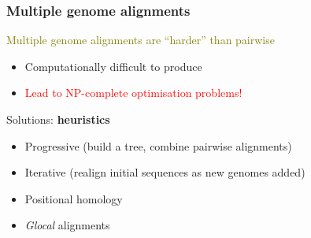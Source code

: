 %
\begin{frame}
  \frametitle{Multiple genome alignments}
  \textcolor{olive}{Multiple genome alignments are ``harder'' than pairwise} \\
  \begin{itemize}
    \item Computationally difficult to produce
    \item \textcolor{red}{Lead to NP-complete optimisation problems!}
  \end{itemize}  
  \textcolor{hutton_green}{Solutions:} \textbf{heuristics}
  \begin{itemize}
    \item Progressive (build a tree, combine pairwise alignments)
    \item Iterative (realign initial sequences as new genomes added)
    \item \textcolor{hutton_blue}{Positional homology}
    \item \textcolor{hutton_purple}{\textit{Glocal} alignments}
  \end{itemize}  
\end{frame}

